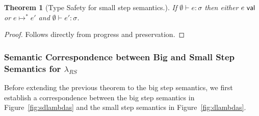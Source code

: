 \documentclass[11pt,leqno]{article}
\newtheorem{trthm}[tr]{Theorem}
\newtheorem{trlem}[tr]{Lemma}
\theoremstyle{definition}
\newcommand{\lambdas}{\lambda_{RS}}
\newcommand{\val}{{\sf val}}
\newcommand{\sreduces}{ \Downarrow }
\begin{document}
\begin{trthm}[Type Safety for small step semantics.] \label{thm:sstypesafte}
If $\emptyset\vdash e : \sigma$ then either $e \ \val$ or $e \mapsto^* e'$ and $\emptyset\vdash e' : \sigma$.
\end{trthm}
\begin{proof}
Follows directly from progress and preservation.
\end{proof}




\subsubsection{Semantic Correspondence between Big and Small Step Semantics for $\lambdas$}

Before extending the previous theorem to the big step semantics, we first establish a correspondence between
the big step semantics in Figure~\ref{fig:sdlambdas} and the small step semantics in Figure~\ref{fig:dlambdas}.

%
%
%
%
%
\end{document}
